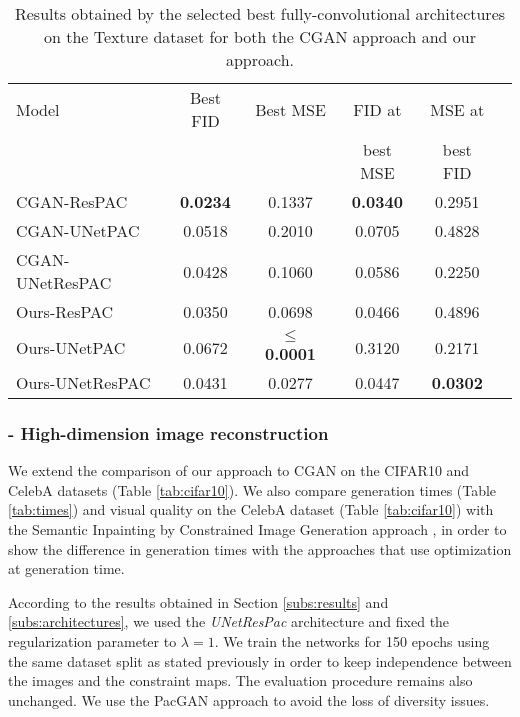 \begin{table}[t]
	\centering
	\begin{tabular}{l c c c c c}
		\Bigrule
		Model           & Best FID & Best MSE & FID at & MSE at \\
		&&&best MSE & best FID  \\
		\bigrule
		CGAN-ResPAC &   \textbf{0.0234} & 0.1337 &  \textbf{0.0340} & 0.2951 \\
		CGAN-UNetPAC &  0.0518 & 0.2010 & 0.0705 & 0.4828\\
		CGAN-UNetResPAC & 0.0428 & 0.1060 & 0.0586 & 0.2250\\
		\bigrule
		Ours-ResPAC &  0.0350 & 0.0698 & 0.0466 & 0.4896\\
		Ours-UNetPAC &  0.0672 & \textbf{$\leq$ 0.0001}  & 0.3120 & 0.2171 \\
		Ours-UNetResPAC & 0.0431 & 0.0277 &0.0447 & \textbf{0.0302}\\
	\end{tabular}
	
	\caption[Results obtained by the selected best fully-convolutional architectures]{Results obtained by the selected best fully-convolutional architectures on the Texture dataset for both the CGAN approach and our approach.}
	\label{tab:ablation-cgan}
\end{table}

\subsubsection{- High-dimension image reconstruction}
We extend the comparison of our approach to CGAN on the CIFAR10 and CelebA  datasets (Table \ref{tab:cifar10}). We also compare generation times (Table \ref{tab:times}) and visual quality on the CelebA dataset (Table \ref{tab:cifar10}) with the Semantic Inpainting by Constrained Image Generation approach \citep{Yeh2017}, in order to show the difference in generation times with the approaches that use optimization at generation time.

 According to the results obtained in Section \ref{subs:results} and \ref{subs:architectures}, we used the \textit{UNetResPac} architecture and fixed the regularization parameter to $\lambda=1$. We train the networks for 150 epochs using the same dataset split as stated previously in order to keep independence between the images and the constraint maps. The evaluation procedure remains also unchanged. We use the PacGAN approach to avoid the loss of diversity issues. 
 
